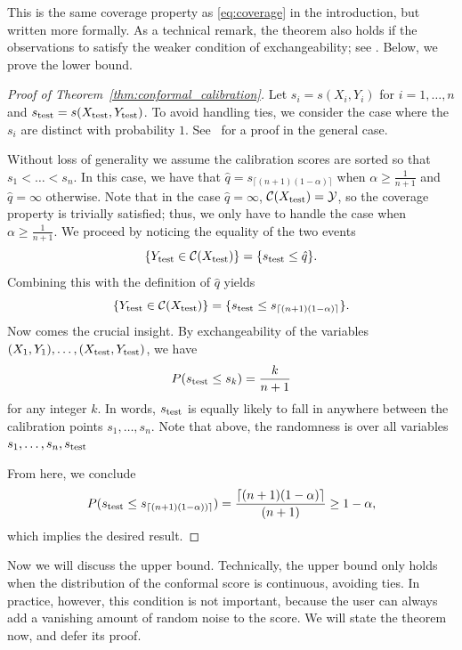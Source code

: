 \documentclass[10pt]{article}
\newcommand{\Y}{\mathcal{Y}}
\newcommand{\C}{\mathcal{C}}
\begin{document}
This is the same coverage property as \eqref{eq:coverage} in the introduction, but written more formally.
As a technical remark, the theorem also holds if the observations to satisfy the weaker condition of exchangeability; see \cite{vovk2005algorithmic}. 
Below, we prove the lower bound.
\begin{proof}[Proof of Theorem~\ref{thm:conformal_calibration}]
Let $s_i = s(X_i, Y_i)$ for $i = 1,\dots,n$ and $s_{\rm test} = s(X_{\rm test}, Y_{\rm test})$. To avoid handling ties, we consider the case where the $s_i$ are distinct with probability $1$. See~\cite{tibshirani2019conformal} for a proof in the general case.

Without loss of generality we assume the calibration scores are sorted so that $s_1 < \dots < s_n$. In this case, we have that $\hat{q} = s_{\lceil (n+1)(1-\alpha) \rceil}$ when $\alpha \geq \frac{1}{n+1}$ and $\hat{q}=\infty$ otherwise. 
Note that in the case $\hat{q}=\infty$, $\C(X_{\rm test}) = \Y$, so the coverage property is trivially satisfied; thus, we only have to handle the case when $\alpha \geq \frac{1}{n+1}$.
We proceed by noticing the equality of the two events
\begin{equation}
\{Y_{\rm test} \in \C(X_{\rm test})\} = \{s_{\rm test} \le \hat{q}\}.
\end{equation}
Combining this with the definition of $\hat{q}$ yields
\begin{equation}
\{Y_{\rm test} \in \C(X_{\rm test})\} = \{s_{\rm test} \leq s_{\lceil (n+1)(1-\alpha)\rceil}\}.
\end{equation}
Now comes the crucial insight. By exchangeability of the variables $(X_1,Y_1),\dots,(X_{\rm test},Y_{\rm test})$, we have
\begin{equation*}
    P(s_{\rm test} \le s_k) = \frac{k}{n+1}
\end{equation*}
for any integer $k$. In words, $s_{\rm test}$ is equally likely to fall in anywhere between the calibration points $s_1,\dots,s_n$. Note that above, the randomness is over all variables $s_1,\dots,s_{n},s_{\rm test}$

From here, we conclude
\begin{equation*}
    P( s_{\rm test} \le s_{\lceil (n+1)(1-\alpha))\rceil}) = \frac{\lceil (n+1)(1-\alpha)\rceil}{(n+1)} \ge 1-\alpha,
\end{equation*}
which implies the desired result.
\end{proof}

Now we will discuss the upper bound.
Technically, the upper bound only holds when the distribution of the conformal score is continuous, avoiding ties. 
In practice, however, this condition is not important, because the user can always add a vanishing amount of random noise to the score.
We will state the theorem now, and defer its proof.
\end{document}
